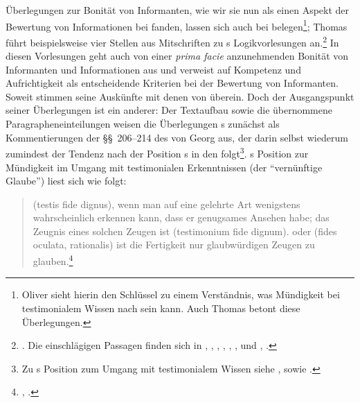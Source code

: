 Überlegungen zur Bonität von Informanten, wie wir sie nun als einen Aspekt der
Bewertung von Informationen bei
 fanden, lassen sich auch
bei  belegen\footnote{Oliver
\textcite[][839\,f.]{Scholz:AutonomieangesichtsepistemischerAbhaengigkeiten2001}
sieht hierin den Schlüssel zu einem Verständnis, was Mündigkeit bei
testimonialem Wissen nach  sein kann. Auch Thomas
\textcite[][143--146]{Kater:PolitikRechtGeschichte1999} betont diese
Überlegungen.}; Thomas  führt beispielsweise vier Stellen
aus Mitschriften zu s Logikvorlesungen
an.\footnote{\cite[Vgl.][143--146]{Kater:PolitikRechtGeschichte1999}. Die
einschlägigen Passagen finden sich in \cite[][]{Kant:LogikPoelitz1966}, \cite[][XXIV:
242.4--250.9]{Kant:GesammelteWerke1900ff.},
\cite[][]{Kant:LogikPhilippi1966}, \cite[][XXIV:
448.20--450.35]{Kant:GesammelteWerke1900ff.}, \cite{Kant:LogikPoelitz1966},
\cite[][XXIV: 561.34--563.25]{Kant:GesammelteWerke1900ff.}, und
\cite{Kant:WienerLogik1966}, \cite[][XXIV: 893.24--900.32]{Kant:GesammelteWerke1900ff.}.} In diesen
Vorlesungen geht auch  von einer \emph{prima
facie} anzunehmenden Bonität von Informanten und Informationen aus und verweist
auf Kompetenz und Aufrichtigkeit als entscheidende Kriterien bei der Bewertung von Informanten.
Soweit stimmen seine Auskünfte mit denen von  überein. Doch der
Ausgangspunkt seiner Überlegungen ist ein anderer: Der Textaufbau
sowie die übernommene Paragrapheneinteilungen weisen die Überlegungen
s zunächst als Kommentierungen der \S\S~206--214 des
 von Georg
 aus, der darin selbst wiederum zumindest
der Tendenz nach der Position s in den
 folgt\footnote{Zu
s Position zum Umgang mit testimonialem Wissen siehe
\cite[][200--203]{Wolff:VernuenftigeGedankenvondenKraeftendesmenschlichenVerstandesundihremrichtigenGebraucheinErkenntnisderWahrheit1978},
sowie
\cite[][\S\S~149--161]{Wolff:Cogitationesrationalesdeviribusintellectushumani1983}.}.
s Position zur Mündigkeit im Umgang mit
testimonialen Erkenntnissen (der \enquote{vernünftige Glaube}) liest sich wie
folgt:
\begin{quote}
   (testis fide dignus), wenn man auf eine
  gelehrte Art wenigstens wahrscheinlich erkennen kann, dass er genugsames
  Ansehen habe; das Zeugnis eines solchen Zeugen ist  (testimonium fide dignum).  oder  (fides oculata, rationalis) ist die Fertigkeit nur glaubwürdigen
  Zeugen zu
  glauben.\footnote{\cite[][\S~214]{Meier:AuszugausderVernunftlehre1752},
  \cite[][XVI: 509.20--24]{Kant:GesammelteWerke1900ff.}.}
\end{quote}
